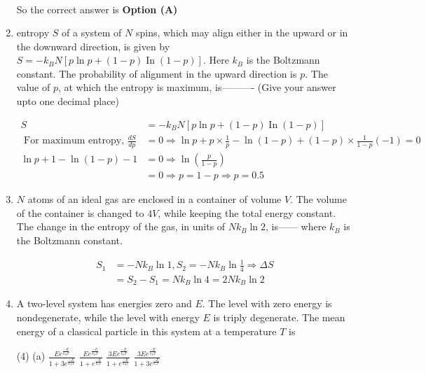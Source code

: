 \begin{enumerate}
\begin{answer}
\begin{align*}
\end{align*}
So the correct answer is \textbf{Option (A)}
\end{answer}	
\item entropy $S$ of a system of $N$ spins, which may align either in the upward or in the downward direction, is given by $S=-k_{B} N[p \ln p+(1-p) \operatorname{In}(1-p)] .$ Here $k_{B}$ is the Boltzmann constant. The probability of alignment in the upward direction is $p$. The value of $p$, at which the entropy is maximum, is---------- (Give your answer upto one decimal place)
{}
\begin{answer}
\begin{align*}
S&=-k_{B} N[p \ln p+(1-p) \operatorname{In}(1-p)]\\
\text{	For maximum entropy, }\frac{d S}{d p}&=0 \Rightarrow \ln p+p \times \frac{1}{p}-\ln (1-p)+(1-p) \times \frac{1}{1-p}(-1)=0\\
\ln p+1-\ln (1-p)-1&=0 \Rightarrow \ln \left(\frac{p}{1-p}\right)\\&=0 \Rightarrow p=1-p \Rightarrow p=0.5
\end{align*}
\end{answer}
\item 	$N$ atoms of an ideal gas are enclosed in a container of volume $V$. The volume of the container is changed to $4 V$, while keeping the total energy constant. The change in the entropy of the gas, in units of $N k_{B} \ln 2$, is------ where $k_{B}$ is the Boltzmann constant.
{}
\begin{answer}
\begin{align*}
S_{1}&=-N k_{B} \ln 1, S_{2}=-N k_{B} \ln \frac{1}{4} \Rightarrow \Delta S\\&=S_{2}-S_{1}=N k_{B} \ln 4=2 N k_{B} \ln 2
\end{align*}
\end{answer}
\item A two-level system has energies zero and $E$. The level with zero energy is nondegenerate, while the level with energy $E$ is triply degenerate. The mean energy of a classical particle in this system at a temperature $T$ is
{}
\begin{tasks}(4)
\task[\textbf{A.}] (a) $\frac{E e^{\frac{-E}{k_{B} T}}}{1+3 e^{\frac{-E}{k_{B} T}}}$
\task[\textbf{B.}] $\frac{E e^{\frac{-E}{k_{B} T}}}{1+e^{\frac{-E}{k_{s} T}}}$
\task[\textbf{C.}] $\frac{3 E e^{\frac{-E}{k_{B} T}}}{1+e^{\frac{-E}{k_{B} T}}}$
\task[\textbf{D.}] $\frac{3 E e^{\frac{-E}{k_{B} T}}}{1+3 e^{\frac{-E}{k_{s} T}}}$

\end{tasks}
\end{enumerate}
